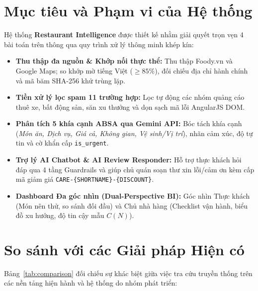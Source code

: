 \section{Mục tiêu và Phạm vi của Hệ thống}
Hệ thống \textbf{Restaurant Intelligence} được thiết kế nhằm giải quyết trọn vẹn 4 bài toán trên thông qua quy trình xử lý thông minh khép kín:
\begin{itemize}
    \item \textbf{Thu thập đa nguồn \& Khớp nối thực thể:} Thu thập Foody.vn và Google Maps; so khớp mờ tiếng Việt ($\ge 85\%$), đối chiếu địa chỉ hành chính và mã băm SHA-256 khử trùng lặp.
    \item \textbf{Tiền xử lý lọc spam 11 trường hợp:} Lọc tự động các nhóm quảng cáo thuê xe, bất động sản, săn xu thưởng và dọn sạch mã lỗi AngularJS DOM.
    \item \textbf{Phân tích 5 khía cạnh ABSA qua Gemini API:} Bóc tách khía cạnh (\textit{Món ăn, Dịch vụ, Giá cả, Không gian, Vệ sinh/Vị trí}), nhãn cảm xúc, độ tự tin và cờ khẩn cấp \texttt{is\_urgent}.
    \item \textbf{Trợ lý AI Chatbot \& AI Review Responder:} Hỗ trợ thực khách hỏi đáp qua 4 tầng Guardrails và giúp chủ quán soạn thư xin lỗi/cảm ơn kèm cấp mã giảm giá \texttt{CARE-\{SHORTNAME\}-\{DISCOUNT\}}.
    \item \textbf{Dashboard Đa góc nhìn (Dual-Perspective BI):} Góc nhìn Thực khách (Món nên thử, so sánh đối đầu) và Chủ nhà hàng (Checklist vận hành, biểu đồ xu hướng, độ tin cậy mẫu $C(N)$).
\end{itemize}

\section{So sánh với các Giải pháp Hiện có}
Bảng~\ref{tab:comparison} đối chiếu sự khác biệt giữa việc tra cứu truyền thống trên các nền tảng hiện hành và hệ thống do nhóm phát triển:

